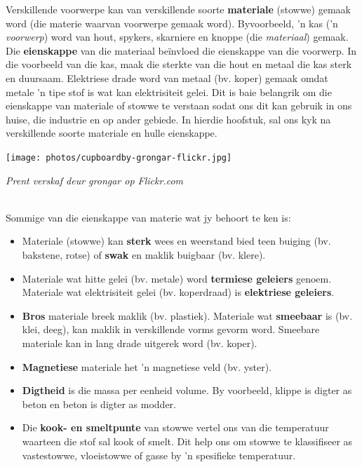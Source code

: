             \begin{minipage}{.5\textwidth}
      \label{m38708*id62185}Verskillende voorwerpe kan van verskillende soorte \textbf{materiale} (stowwe) gemaak word (die materie waarvan voorwerpe gemaak word). Byvoorbeeld, 'n kas ('n \textsl{voorwerp}) word van hout, spykers, skarniere en knoppe (die \textsl{materiaal}) gemaak. Die \textbf{eienskappe} van die materiaal be\"invloed die eienskappe van die voorwerp. In die voorbeeld van die kas, maak die sterkte van die hout en metaal die kas sterk en duursaam. Elektriese drade word van metaal (bv. koper) gemaak omdat metale 'n tipe stof is wat kan elektrisiteit gelei. Dit is baie belangrik om die eienskappe van materiale of stowwe te verstaan sodat ons dit kan gebruik in ons huise, die industrie en op ander gebiede. In hierdie hoofstuk, sal ons kyk na verskillende soorte materiale en hulle eienskappe.\par 
\end{minipage}
\begin{minipage}{.5\textwidth}
\begin{center}
 \texttt{[image: photos/cupboardby-grongar-flickr.jpg]}\par
\textit{Prent verskaf deur grongar op Flickr.com}
\end{center}
\end{minipage} \\
\label{m38708*id0132}Sommige van die eienskappe van materie wat jy behoort te ken is:
\label{m38708*lid825}\begin{itemize}[noitemsep]
  \item Materiale (stowwe) kan \textbf{sterk} wees en weerstand bied teen buiging (bv. bakstene, rotse) of \textbf{swak} en maklik buigbaar (bv. klere).
  \item Materiale wat hitte gelei (bv. metale) word \textbf{termiese geleiers} genoem. Materiale wat elektrisiteit gelei (bv. koperdraad) is \textbf{elektriese geleiers}.
  \item \textbf{Bros} materiale breek maklik (bv. plastiek). Materiale wat \textbf{smeebaar} is (bv. klei, deeg), kan maklik in verskillende vorms gevorm word. Smeebare materiale kan in lang drade uitgerek word (bv. koper).
  \item \textbf{Magnetiese} materiale het 'n magnetiese veld (bv. yster).
  \item \textbf{Digtheid} is die massa per eenheid volume. By voorbeeld, klippe is digter as beton en beton is digter as modder.
  \item Die \textbf{kook- en smeltpunte} van stowwe vertel ons van die temperatuur waarteen die stof sal kook of smelt. Dit help ons om stowwe te klassifiseer as vastestowwe, vloeistowwe of gasse by 'n spesifieke temperatuur.\end{itemize}
\par 


